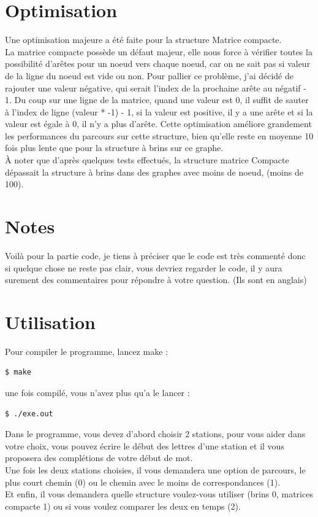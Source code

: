 \documentclass[11pt]{article}
\begin{document}
\section{Optimisation}
Une optimisation majeure a été faite pour la structure Matrice compacte.\\
La matrice compacte possède un défaut majeur, elle nous force à vérifier toutes la possibilité d'arêtes pour un noeud vers chaque noeud, car on ne sait pas si valeur de la ligne du noeud est vide ou non. Pour pallier ce problème, j'ai décidé de rajouter une valeur négative, qui serait l'index de la prochaine arête au négatif - 1. Du coup sur une ligne de la matrice, quand une valeur est 0, il suffit de sauter à l'index de ligne (valeur * -1) - 1, si la valeur est positive, il y a une arête et si la valeur est égale à 0, il n'y a plus d'arête. Cette optimisation améliore grandement les performances du parcours sur cette structure, bien qu'elle reste en moyenne 10 fois plus lente que pour la structure à brins sur ce graphe.\\
À noter que d'après quelques tests effectués, la structure matrice Compacte dépassait la structure à brins dans des graphes avec moins de noeud, (moins de 100).
\section{Notes}
Voilà pour la partie code, je tiens à préciser que le code est très commenté donc si quelque chose ne reste pas clair, vous devriez regarder le code, il y aura surement des commentaires pour répondre à votre question. (Ils sont en anglais)
\section{Utilisation}
Pour compiler le programme, lancez make :
\begin{lstlisting}
$ make
\end{lstlisting}
une fois compilé, vous n'avez plus qu'a le lancer :
\begin{lstlisting}
$ ./exe.out
\end{lstlisting}
Dans le programme, vous devez d'abord choisir 2 stations, pour vous aider dans votre choix, vous pouvez écrire le début des lettres d'une station et il vous proposera des complétions de votre début de mot.\\
Une fois les deux stations choisies, il vous demandera une option de parcours, le plus court chemin (0) ou le chemin avec le moins de correspondances (1).\\
Et enfin, il vous demandera quelle structure voulez-vous utiliser (brins 0, matrices compacte 1) ou si vous voulez comparer les deux en temps (2).
\end{document}
